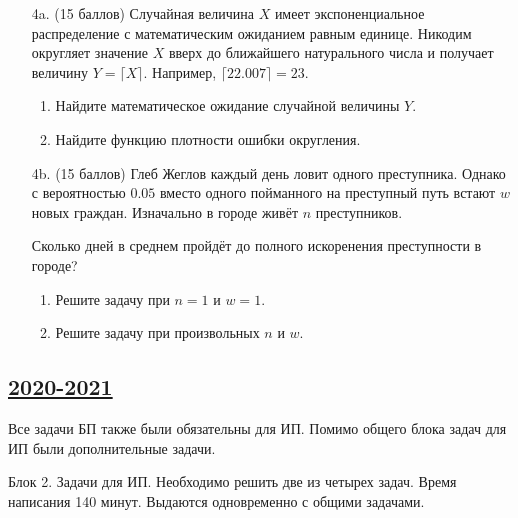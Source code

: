 \begin{enumerate}[resume]
\item[4a.] (15 баллов) Случайная величина $X$ имеет экспоненциальное распределение с математическим ожиданием равным единице. 
Никодим округляет значение $X$ вверх до ближайшего натурального числа и получает величину $Y = \lceil X \rceil$.
Например, $\lceil 22.007 \rceil = 23$.

\begin{enumerate}
    \item Найдите математическое ожидание случайной величины $Y$.
\item Найдите функцию плотности ошибки округления.
\end{enumerate}

\item[4b.] (15 баллов) Глеб Жеглов каждый день ловит одного преступника. 
Однако с вероятностью $0.05$ вместо одного пойманного на 
преступный путь встают $w$ новых граждан. Изначально в городе живёт $n$ преступников. 

Сколько дней в среднем пройдёт до полного искоренения преступности в городе?

\begin{enumerate}
    \item Решите задачу при $n=1$ и $w=1$.
    \item Решите задачу при произвольных $n$ и $w$.
\end{enumerate}


\end{enumerate}


\subsection[2020-2021]{\hyperref[sec:sol_kr_01_ip_2020_2021]{2020-2021}}
\label{sec:kr_01_ip_2020_2021}

Все задачи БП также были обязательны для ИП. Помимо общего блока задач для ИП были дополнительные задачи.

Блок 2. Задачи для ИП. Необходимо решить две из четырех задач. Время написания 140 минут. Выдаются одновременно с общими задачами.

